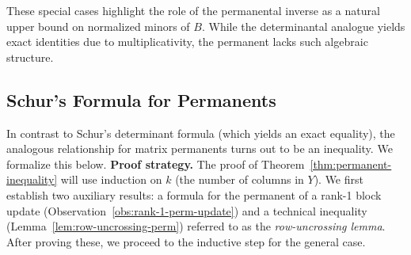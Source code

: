 \documentclass[11pt]{article}
\theoremstyle{definition}
\begin{document}
These special cases highlight the role of the permanental inverse as a natural upper bound on normalized minors of $B $. While the determinantal analogue yields exact identities due to multiplicativity, the permanent lacks such algebraic structure.
\subsection{Schur's Formula for Permanents}
\label{sec:schur-permanent}
In contrast to Schur's determinant formula (which yields an exact equality), the analogous relationship for matrix permanents turns out to be an inequality. We formalize this below.
\PermanentInequality*
\noindent\textbf{Proof strategy.} The proof of Theorem~\ref{thm:permanent-inequality} will use induction on $k$ (the number of columns in $Y$). We first establish two auxiliary results: a formula for the permanent of a rank-1 block update (Observation~\ref{obs:rank-1-perm-update}) and a technical inequality (Lemma~\ref{lem:row-uncrossing-perm}) referred to as the \emph{row-uncrossing lemma}. After proving these, we proceed to the inductive step for the general case.
\end{document}
